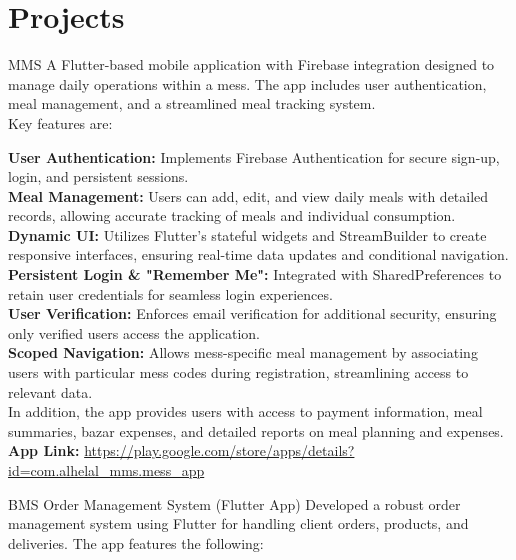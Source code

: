 \documentclass[a4paper,12pt]{article}
\begin{document}
\section{Projects}
\begin{CV}
  \item[MMS] 
A Flutter-based mobile application with Firebase integration designed to manage daily operations within a mess. The app includes user authentication, meal management, and a streamlined meal tracking system.\\
Key features are:

\textbf{User Authentication:} Implements Firebase Authentication for secure sign-up, login, and persistent sessions.\\
\textbf{Meal Management:} Users can add, edit, and view daily meals with detailed records, allowing accurate tracking of meals and individual consumption.\\
\textbf{Dynamic UI:} Utilizes Flutter's stateful widgets and StreamBuilder to create responsive interfaces, ensuring real-time data updates and conditional navigation.\\
\textbf{Persistent Login \& "Remember Me":} Integrated with SharedPreferences to retain user credentials for seamless login experiences.\\
\textbf{User Verification:} Enforces email verification for additional security, ensuring only verified users access the application.\\
\textbf{Scoped Navigation:} Allows mess-specific meal management by associating users with particular mess codes during registration, streamlining access to relevant data.\\

In addition, the app provides users with access to payment information, meal summaries, bazar expenses, and detailed reports on meal planning and expenses.\\
\textbf{App Link:} \href{https://play.google.com/store/apps/details?id=com.alhelal\_mms.mess\_app}{https://play.google.com/store/apps/details?id=com.alhelal\_mms.mess\_app}
\item[BMS] Order Management System (Flutter App)
  Developed a robust order management system using Flutter for handling client orders, products, and deliveries. The app features the following:
  

\end{CV}
\end{document}
